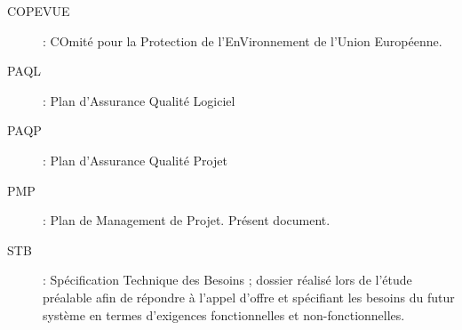\begin{description}
\item[COPEVUE] : COmité pour la Protection de l'EnVironnement de l'Union
Européenne.
\item[PAQL] : Plan d'Assurance Qualité Logiciel
\item[PAQP] : Plan d'Assurance Qualité Projet
\item[PMP] : Plan de Management de Projet. Présent document.
\item[STB] : Spécification Technique des Besoins ; dossier réalisé lors de
l'étude préalable afin de répondre à l'appel d'offre et spécifiant les
besoins du futur système en termes d'exigences fonctionnelles et
non-fonctionnelles.
\end{description}
